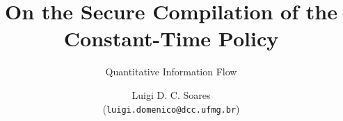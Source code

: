 \documentclass[t, aspectratio=169]{beamer}
\title[Secure Compilation]{%
    On the Secure Compilation of the Constant-Time 
    Policy}
\subtitle{Quantitative Information Flow}
\author[luigi.domenico@dcc.ufmg.br]{%
    Luigi D. C. Soares\texorpdfstring{\\}{}
    (\texttt{luigi.domenico@dcc.ufmg.br})}
\institute[DCC/UFMG]{%
    Department of Computer Science \\
    Federal University of Minas Gerais}
\date[2021/1]{}
\begin{document}
\begin{frame}
\titlepage
\end{frame}







\end{document}
